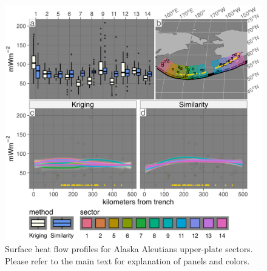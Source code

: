 \begin{figure}[htbp]

{\centering \includegraphics[width=1\linewidth,]{assets/figs/chpt3/AlaskaAleutiansUpperPlate} 

}

\caption[Surface heat flow profiles for Alaska Aleutians upper-plate sectors]{Surface heat flow profiles for Alaska Aleutians upper-plate sectors. Please refer to the main text for explanation of panels and colors.}\label{fig:alaskaAleutiansUpper}
\end{figure}

